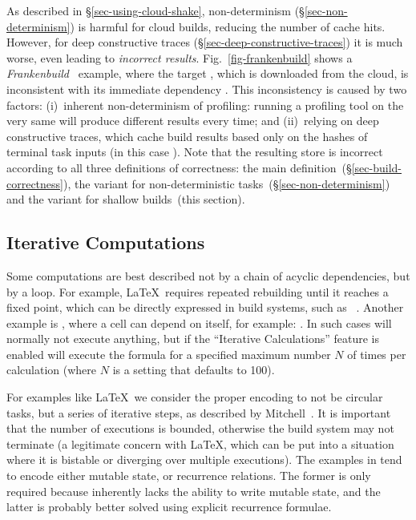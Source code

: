 As described in \S\ref{sec-using-cloud-shake}, non-determinism  (\S\ref{sec-non-determinism})
is harmful for cloud builds, reducing the number of cache hits.
However, for deep constructive traces (\S\ref{sec-deep-constructive-traces}) it
is much worse, even leading to \emph{incorrect results}.
Fig.~\ref{fig-frankenbuild} shows a
\emph{Frankenbuild}~\cite{esfahani2016cloudbuild} example, where the target
, which is downloaded from the cloud, is inconsistent with its
immediate dependency . This inconsistency is caused by two factors:
(i)~inherent non-determinism of profiling: running a profiling tool on the very
same  will produce different  results every time;
and (ii)~relying on deep constructive traces, which cache build results based
only on the hashes of terminal task inputs (in this case ). Note
that the resulting store is incorrect according to all three definitions of
correctness: the main definition~(\S\ref{sec-build-correctness}), the variant
for non-deterministic tasks~(\S\ref{sec-non-determinism}) and the variant for
shallow builds~(this section).


\subsection{Iterative Computations}\label{sec-iterative-compute}

Some computations are best described not by a chain of acyclic dependencies,
but by a loop. For example, \LaTeX~requires repeated rebuilding until it
reaches a fixed point, which can be directly expressed in build systems, such as
\Pluto~\cite{erdweg2015pluto}. Another example is \Excel, where a cell can
depend on itself, for example: . In such cases \Excel will
normally not execute anything, but if the ``Iterative Calculations'' feature is
enabled \Excel will execute the formula for a specified maximum number $N$ of
times per calculation (where $N$ is a setting that defaults to 100).

For examples like \LaTeX~we consider the proper encoding to not be circular
tasks, but a series of iterative steps, as described by
Mitchell~. It is important that the number of
executions is bounded, otherwise the build system may not terminate (a
legitimate concern with \LaTeX, which can be put into a situation where it is
bistable or diverging over multiple executions). The examples in \Excel tend to
encode either mutable state, or recurrence relations. The former is only
required because \Excel inherently lacks the ability to write mutable state, and
the latter is probably better solved using explicit recurrence formulae.

